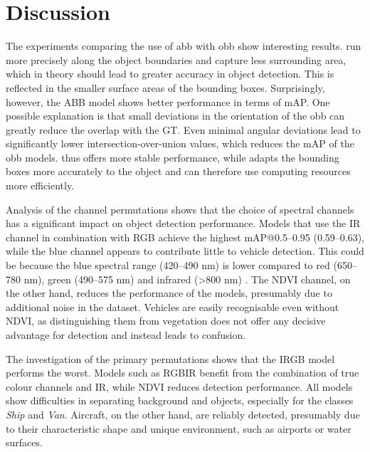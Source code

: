 \chapter{Discussion}
\label{ch:discussion}


The experiments comparing the use of \acrlong{abb} with \acrlong{obb} show interesting results.  run more precisely along the object boundaries and capture less surrounding area, which in theory should lead to greater accuracy in object detection. This is reflected in the smaller surface areas of the bounding boxes. Surprisingly, however, the ABB model shows better performance in terms of \Acrlong{mAP}. One possible explanation is that small deviations in the orientation of the \acrshort{obb} can greatly reduce the overlap with the \Acrlong{GT}. Even minimal angular deviations lead to significantly lower intersection-over-union values, which reduces the \acrshort{mAP} of the \acrshort{obb} models.  thus offers more stable performance, while  adapts the bounding boxes more accurately to the object and can therefore use computing resources more efficiently.
 
Analysis of the channel permutations shows that the choice of spectral channels has a significant impact on object detection performance. Models that use the IR channel in combination with RGB achieve the highest \acrshort{mAP}@0.5--0.95 (0.59–0.63), while the blue channel appears to contribute little to vehicle detection. This could be because the blue spectral range (420–490 nm) is lower compared to red (650–780 nm), green (490–575 nm) and infrared (>800 nm) \cite{bfs_Strahlung}. The NDVI channel, on the other hand, reduces the performance of the models, presumably due to additional noise in the dataset. Vehicles are easily recognisable even without NDVI, as distinguishing them from vegetation does not offer any decisive advantage for detection and instead leads to confusion. %

The investigation of the primary permutations shows that the IRGB model performs the worst. Models such as RGBIR benefit from the combination of true colour channels and IR, while NDVI reduces detection performance. All models show difficulties in separating background and objects, especially for the classes \textit{Ship} and \textit{Van}. Aircraft, on the other hand, are reliably detected, presumably due to their characteristic shape and unique environment, such as airports or water surfaces.
 
